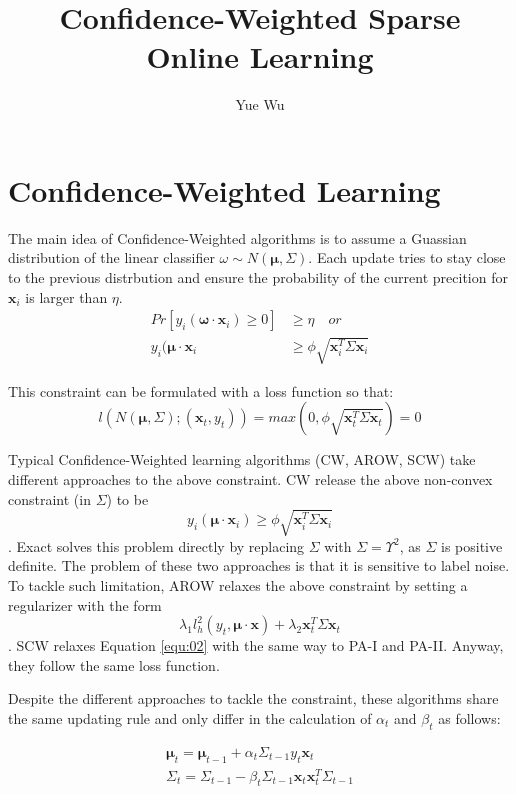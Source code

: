 \documentclass{article}
\begin{document}
\title{Confidence-Weighted Sparse Online Learning}
\author{Yue Wu}

\section{Confidence-Weighted Learning}
The main idea of Confidence-Weighted algorithms is to assume a Guassian distribution 
of the linear classifier $\omega\sim N(\bm{\mu},\Sigma)$. Each update
tries to stay close to the previous distrbution and ensure the
probability of the current precition for $\bm{x}_i$ is larger than
$\eta$.
\begin{equation}
  \begin{aligned}
    Pr[y_i(\bm{\omega}\cdot \bm{x}_i) \geq 0] & \geq \eta \quad or \\
    y_i(\bm{\mu}\cdot \bm{x}_i & \geq  \phi\sqrt{\bm{x}_i^T\Sigma\bm{x}_i}
  \end{aligned}
  \label{equ:01}
\end{equation}

This constraint can be formulated with a loss function  so that:
\begin{equation}
  l(N(\bm{\mu},\Sigma);(\bm{x}_t,y_t)) = max (0,
  \phi\sqrt{\bm{x}_t^T\Sigma\bm{x}_t}) = 0
  \label{equ:02}
\end{equation}

Typical Confidence-Weighted learning algorithms (CW, AROW, SCW) take
different approaches to the above constraint. CW release the above
non-convex constraint (in $\Sigma$) to be $$y_i(\bm{\mu}\cdot\bm{x}_i)
\geq \phi\sqrt{\bm{x}_i^T\Sigma\bm{x}_i}$$. Exact solves this problem
directly by replacing $\Sigma$ with $\Sigma=\Upsilon^2$, as $\Sigma$
is positive definite. The problem of these two approaches is that it
is sensitive to label noise. To tackle such limitation, AROW relaxes 
the above constraint by setting a regularizer with the form 
$$\lambda_1 l_h^2(y_t, \bm{\mu}\cdot\bm{x}) + \lambda_2\bm{x}_t^T\Sigma\bm{x}_t$$. 
SCW relaxes Equation \ref{equ:02} with the same way to PA-I and PA-II.
Anyway, they follow the same loss function. 

Despite the different approaches to tackle the constraint, these algorithms 
share the same updating rule and only differ in the calculation of $\alpha_t$ 
and $\beta_t$ as follows:

\begin{equation}
  \begin{aligned}
    \bm{\mu}_t = \bm{\mu}_{t-1} + \alpha_t\Sigma_{t-1}y_t\bm{x}_t  \\
    \Sigma_t = \Sigma_{t-1} - \beta_t\Sigma_{t-1}\bm{x}_t\bm{x}_t^T\Sigma_{t-1}
  \end{aligned}
  \label{equ:03}
\end{equation}
\end{document}
